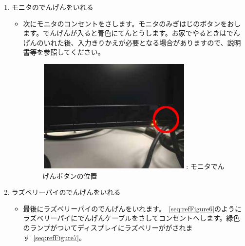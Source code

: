 \documentclass[a4paper,12pt]{jarticle}
\begin{document}
\begin{enumerate}
\begin{enumerate}
\begin{itemize}
                \bigskip
        \end{itemize}
  \item モニタのでんげんをいれる

        \begin{itemize}
          \item
                次にモニタのコンセントをさします。モニタのみぎはじのボタンをおします。でんげんが入ると青色にてんとうします。お家でやるときはでんげんのいれた後、入力きりかえが必要となる場合がありますので、説明書等を参照してください。


                \begin{figure}[h]
                  \centering
                  \begin{minipage}{0.45\textwidth}
                    {\upshape
                      \includegraphics[width=0.8\linewidth]{textbook-img019.png}
                      \newline
                      :
                      モニタでんげんボタンの位置}
                  \end{minipage}
                \end{figure}
        \end{itemize}
  \item ラズベリーパイのでんげんをいれる

        \begin{itemize}
          \item
                最後にラズベリーパイのでんげんをいれます。~\ref{seq:refFigure6}のようにラズベリーパイにでんげんケーブルをさしてコンセントへします。緑色のランプがついてディスプレイにラズベリーががされます~\ref{seq:refFigure7}。
        \end{itemize}


\end{enumerate}
\end{enumerate}
\end{document}
